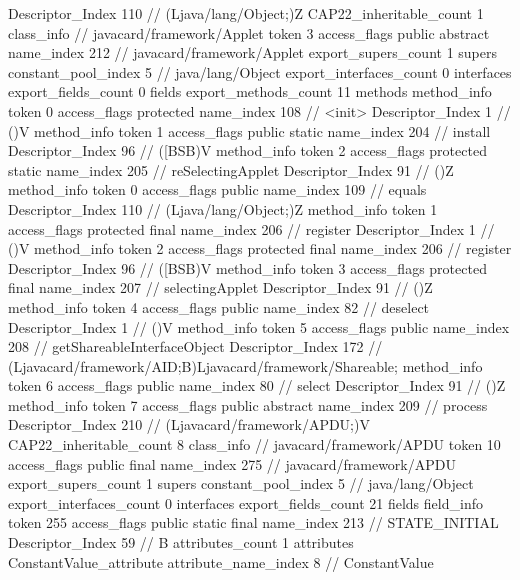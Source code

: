 {{{{{					Descriptor_Index	110		// (Ljava/lang/Object;)Z
				}
			}
			CAP22_inheritable_count	1
		}
		class_info {		// javacard/framework/Applet
			token	3
			access_flags	public abstract
			name_index	212		// javacard/framework/Applet
			export_supers_count	1
			supers {
				constant_pool_index	5		// java/lang/Object
			}
			export_interfaces_count	0
			interfaces {
			}
			export_fields_count	0
			fields {
			}
			export_methods_count	11
			methods {
				method_info {
					token	0
					access_flags	protected
					name_index	108		// <init>
					Descriptor_Index	1		// ()V
				}
				method_info {
					token	1
					access_flags	public static
					name_index	204		// install
					Descriptor_Index	96		// ([BSB)V
				}
				method_info {
					token	2
					access_flags	protected static
					name_index	205		// reSelectingApplet
					Descriptor_Index	91		// ()Z
				}
				method_info {
					token	0
					access_flags	public
					name_index	109		// equals
					Descriptor_Index	110		// (Ljava/lang/Object;)Z
				}
				method_info {
					token	1
					access_flags	protected final
					name_index	206		// register
					Descriptor_Index	1		// ()V
				}
				method_info {
					token	2
					access_flags	protected final
					name_index	206		// register
					Descriptor_Index	96		// ([BSB)V
				}
				method_info {
					token	3
					access_flags	protected final
					name_index	207		// selectingApplet
					Descriptor_Index	91		// ()Z
				}
				method_info {
					token	4
					access_flags	public
					name_index	82		// deselect
					Descriptor_Index	1		// ()V
				}
				method_info {
					token	5
					access_flags	public
					name_index	208		// getShareableInterfaceObject
					Descriptor_Index	172		// (Ljavacard/framework/AID;B)Ljavacard/framework/Shareable;
				}
				method_info {
					token	6
					access_flags	public
					name_index	80		// select
					Descriptor_Index	91		// ()Z
				}
				method_info {
					token	7
					access_flags	public abstract
					name_index	209		// process
					Descriptor_Index	210		// (Ljavacard/framework/APDU;)V
				}
			}
			CAP22_inheritable_count	8
		}
		class_info {		// javacard/framework/APDU
			token	10
			access_flags	public final
			name_index	275		// javacard/framework/APDU
			export_supers_count	1
			supers {
				constant_pool_index	5		// java/lang/Object
			}
			export_interfaces_count	0
			interfaces {
			}
			export_fields_count	21
			fields {
			field_info {
				token	255
				access_flags	public static final
				name_index	213		// STATE_INITIAL
				Descriptor_Index	59		// B
				attributes_count	1
				attributes {
				ConstantValue_attribute {
					attribute_name_index	8		// ConstantValue
}}}}}}}
